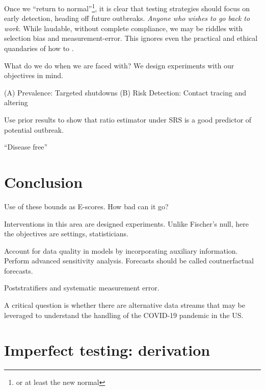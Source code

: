 \documentclass[11pt]{article}
\numberwithin{equation}{section}
\theoremstyle{plain}
\begin{document}
Once we ``return to normal''\footnote{or at least the new normal}, it is clear that testing strategies should focus on early detection, heading off future outbreaks.
\emph{Anyone who wishes to go back to work}.  While laudable, without complete compliance, we may be riddles with selection bias and measurement-error.  This ignores even the practical and ethical quandaries of how to .

What do we do when we are faced with?  We design experiments with our objectives in mind.

(A) Prevalence: Targeted shutdowns
(B) Risk Detection: Contact tracing and altering

Use prior results to show that ratio estimator under SRS is a good predictor of potential outbreak.

``Disease free''


\section{Conclusion}

Use of these bounds as E-scores.  How bad can it go?

Interventions in this area are designed experiments.  Unlike Fischer's null, here the objectives are settings, statisticians.

Account for data quality in models by incorporating auxiliary information.  Perform advanced sensitivity analysis.  Forecasts should be called coutnerfactual forecasts.

Poststratifiers and systematic measurement error.

A critical question is whether there are alternative data streams that may be leveraged to understand the handling of the COVID-19 pandemic in the US.

\appendix

\section{Imperfect testing: derivation}
\end{document}
